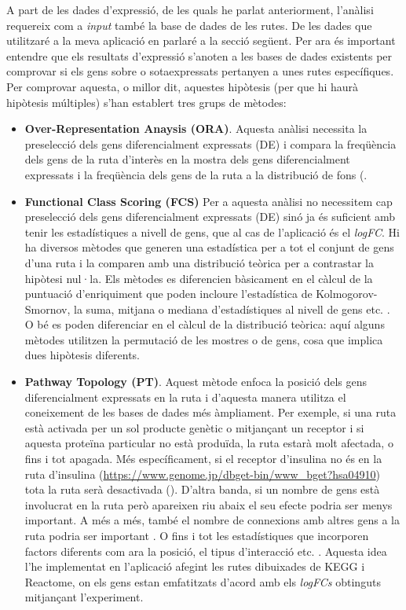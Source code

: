 A part de les dades d'expressió, de les quals he parlat anteriorment, l'anàlisi requereix com a \textit{input} també la base de dades de les rutes. De les dades que utilitzaré a la meva aplicació en parlaré a la secció següent. Per ara és important entendre que els resultats d'expressió s'anoten a les bases de dades existents per comprovar si els gens sobre o sotaexpressats pertanyen a unes rutes específiques. Per comprovar aquesta, o millor dit, aquestes hipòtesis (per que hi haurà hipòtesis múltiples) s'han establert tres grups de mètodes:

\begin{itemize}
\item \textbf{Over-Representation Anaysis (\gls{ORA})}.
Aquesta anàlisi necessita la preselecció dels gens diferencialment expressats (DE) i compara la freqüència dels gens de la ruta d'interès en la mostra dels gens diferencialment expressats i la freqüència dels gens de la ruta a la distribució de fons (\cite{boyle2004go}. 
\item \textbf{Functional Class Scoring (\gls{FCS})}
Per a aquesta anàlisi no necessitem cap preselecció dels gens diferencialment expressats (DE) sinó ja és suficient amb tenir les estadístiques a nivell de gens, que al cas de l'aplicació és el \textit{\gls{logFC}}. Hi ha diversos mètodes que generen una estadística per a tot el conjunt de gens d'una ruta i la comparen amb una distribució teòrica per a contrastar la hipòtesi nul·la. Els mètodes es diferencien bàsicament en el càlcul de la puntuació d'enriquiment que poden incloure l'estadística de Kolmogorov-Smornov, la suma, mitjana o mediana d'estadístiques al nivell de gens etc. \cite{khatri2012ten}. O bé es poden diferenciar en el càlcul de la distribució teòrica: aquí alguns mètodes utilitzen la permutació de les mostres o de gens, cosa que implica dues hipòtesis diferents. 
\item \textbf{Pathway Topology (\gls{PT})}.
Aquest mètode enfoca la posició dels gens diferencialment expressats en la ruta i d'aquesta manera utilitza el coneixement de les bases de dades més àmpliament. Per exemple, si una ruta està activada per un sol producte genètic o mitjançant un receptor i si aquesta proteïna particular no està produïda, la ruta estarà molt afectada, o fins i tot apagada. Més específicament, si el receptor d'insulina no és en la ruta d'insulina (\url{https://www.genome.jp/dbget-bin/www_bget?hsa04910}) tota la ruta serà desactivada (\cite{tarca2008novel}). D'altra banda, si un nombre de gens està involucrat en la ruta però apareixen riu abaix el seu efecte podria ser menys important. A més a més, també el nombre de connexions amb altres gens a la ruta podria ser important \cite{rahnenfuhrer2004calculating}. O fins i tot les estadístiques que incorporen factors diferents com ara la posició, el tipus d'interacció etc. \cite{draghici2007systems}. Aquesta idea l'he implementat en l'aplicació afegint les rutes dibuixades de \gls{KEGG} i Reactome, on els gens estan emfatitzats d'acord amb els \textit{\gls{logFC}s} obtinguts mitjançant l'experiment.


\end{itemize}
